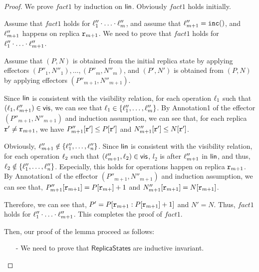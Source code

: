 \begin {proof}

We prove $fact1$ by induction on $\alinord$. Obviously $fact1$ holds initially.

Assume that $fact1$ holds for $\alabel''_1 \cdot \ldots \cdot \alabel''_m$, and assume that $\alabel''_{m+1} = \alabelshort[{\tt inc}]{}$, and $\alabel''_{m+1}$ happens on replica $\arep_{m+1}$. We need to prove that $fact1$ holds for $\alabel''_1 \cdot \ldots \cdot \alabel''_{m+1}$.

Assume that $(P,N)$ is obtained from the initial replica state by applying effectors $(P''_1,N''_1),\ldots,(P''_m,N''_m)$, and $(P',N')$ is obtained from $(P,N)$ by applying effectors $(P''_{m+1},N''_{m+1})$.

Since $\alinord$ is consistent with the visibility relation, for each operation $\alabel_1$ such that $(\alabel_1,\alabel''_{m+1}) \in \avisord$, we can see that $\alabel_1 \in \{ \alabel''_1,\dots,\alabel''_m \}$. By Annotation1 of the effector $(P''_{m+1},N''_{m+1})$ and induction assumption, we can see that, for each replica $\arep' \neq \arep_{m+1}$, we have $P''_{m+1}[\arep'] \leq P[\arep']$ and $N''_{m+1}[\arep'] \leq N[\arep']$.

Obviously, $\alabel''_{m+1} \notin \{ \alabel''_1,\ldots,\alabel''_n \}$. Since $\alinord$ is consistent with the visibility relation, for each operation $\alabel_2$ such that $(\alabel''_{m+1},\alabel_2) \in \avisord$, $l_2$ is after $\alabel''_{m+1}$ in $\alinord$, and thus, $\alabel_2 \notin \{ \alabel''_1,\ldots,\alabel''_n \}$. Especially, this holds for operations happen on replica $\arep_{m+1}$. By Annotation1 of the effector $(P''_{m+1},N''_{m+1})$ and induction assumption, we can see that, $P''_{m+1}[\arep_{m+1}] = P[\arep_{m+}]+1$ and $N''_{m+1}[\arep_{m+1}] = N[\arep_{m+1}]$.

Therefore, we can see that, $P' = P[\arep_{m+1}: P[\arep_{m+1}]+1]$ and $N' = N$. %
Thus, $fact1$ holds for $\alabel''_1 \cdot \ldots \cdot \alabel''_{m+1}$. This completes the proof of $fact1$.


Then, our proof of the lemma proceed as follows:

\begin{itemize}
\setlength{\itemsep}{0.5pt}
\item[-] We need to prove that $\mathsf{ReplicaStates}$ are inductive invariant.


\end{itemize}
\end{proof}
